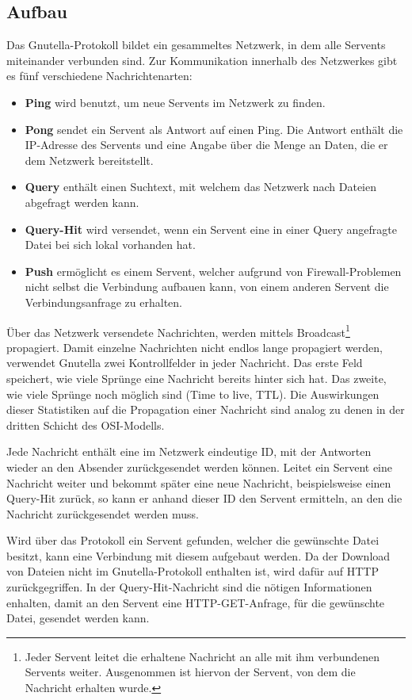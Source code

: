 \subsection{Aufbau}
\label{sec:GnutellaAufbau}
Das Gnutella-Protokoll bildet ein gesammeltes Netzwerk, in dem alle Servents miteinander verbunden sind. Zur Kommunikation innerhalb des Netzwerkes gibt es fünf verschiedene Nachrichtenarten:
\begin{itemize}
    \item \textbf{Ping} wird benutzt, um neue Servents im Netzwerk zu finden. 
    \item \textbf{Pong} sendet ein Servent als Antwort auf einen Ping. Die Antwort enthält die IP-Adresse des Servents und eine Angabe über die Menge an Daten, die er dem Netzwerk bereitstellt. 
    \item \textbf{Query} enthält einen Suchtext, mit welchem das Netzwerk nach Dateien abgefragt werden kann. 
    \item \textbf{Query-Hit} wird versendet, wenn ein Servent eine in einer Query angefragte Datei bei sich lokal vorhanden hat.
    \item \textbf{Push} ermöglicht es einem Servent, welcher aufgrund von Firewall-Problemen nicht selbst die Verbindung aufbauen kann, von einem anderen Servent die Verbindungsanfrage zu erhalten.
\end{itemize}
Über das Netzwerk versendete Nachrichten, werden mittels Broadcast\footnote[1]{Jeder Servent leitet die erhaltene Nachricht an alle mit ihm verbundenen Servents weiter. Ausgenommen ist hiervon der Servent, von dem die Nachricht erhalten wurde.} propagiert.
Damit einzelne Nachrichten nicht endlos lange propagiert werden, verwendet Gnutella zwei Kontrollfelder in jeder Nachricht. Das erste Feld speichert, wie viele Sprünge eine Nachricht bereits hinter sich hat. Das zweite, wie viele Sprünge noch möglich sind (Time to live, TTL). Die Auswirkungen dieser Statistiken auf die Propagation einer Nachricht sind analog zu denen in der dritten Schicht des OSI-Modells. 

Jede Nachricht enthält eine im Netzwerk eindeutige ID, mit der Antworten wieder an den Absender zurückgesendet werden können. Leitet ein Servent eine Nachricht weiter und bekommt später eine neue Nachricht, beispielsweise einen Query-Hit zurück, so kann er anhand dieser ID den Servent ermitteln, an den die Nachricht zurückgesendet werden muss.

Wird über das Protokoll ein Servent gefunden, welcher die gewünschte Datei besitzt, kann eine Verbindung mit diesem aufgebaut werden. Da der Download von Dateien nicht im Gnutella-Protokoll enthalten ist, wird dafür auf HTTP zurückgegriffen. In der Query-Hit-Nachricht sind die nötigen Informationen enhalten, damit an den Servent eine HTTP-GET-Anfrage, für die gewünschte Datei, gesendet werden kann.


